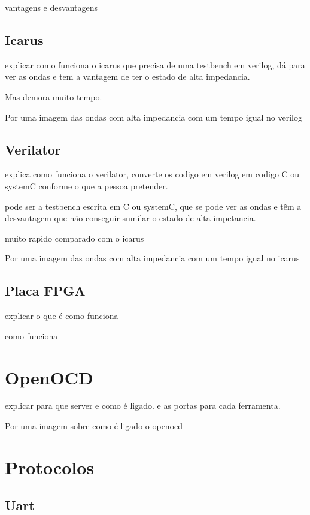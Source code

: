 vantagens e desvantagens

\subsection{Icarus}

explicar como funciona o icarus que precisa de uma testbench em verilog, dá para ver as ondas e tem a vantagem de ter o estado de alta impedancia. 

Mas demora muito tempo.

Por uma imagem das ondas com alta impedancia com um tempo igual no verilog

\subsection{Verilator}

explica como funciona o verilator, converte os codigo em verilog em codigo C ou systemC conforme o que a pessoa pretender.

pode ser a testbench escrita em C ou systemC, que se pode ver as ondas e têm a desvantagem que n\~ao conseguir sumilar o estado de alta impetancia.

muito rapido comparado com o icarus

Por uma imagem das ondas com alta impedancia com um tempo igual no icarus

\subsection{Placa FPGA}

explicar o que é como funciona 

como funciona

\section{OpenOCD}
\label{section:OpenOCD}

explicar para que server e como é ligado. e as portas para cada ferramenta.

Por uma imagem sobre como é ligado o openocd

\section{Protocolos}
\label{section:protocolos}

\subsection{Uart}

